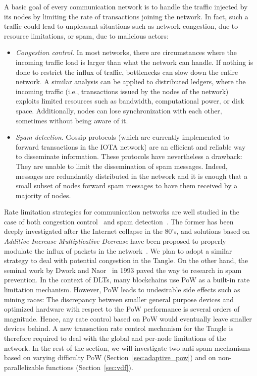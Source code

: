 \documentclass[../main.tex]{subfiles}
\begin{document}
A basic goal of every communication network is to handle the traffic injected by its nodes by limiting the rate of transactions joining the network. In fact, such a traffic could lead to unpleasant situations such as network congestion, due to resource limitations, or spam, due to malicious actors:

\begin{itemize}
    \item \textit{Congestion control.} In most networks, there are circumstances where the incoming traffic load is larger than what the network can handle. If nothing is done to restrict the influx of traffic, bottlenecks can slow down the entire network. A similar analysis can be applied to distributed ledgers, where the incoming traffic (i.e., transactions issued by the nodes of the network) exploits limited resources such as bandwidth, computational power, or disk space. Additionally, nodes can lose synchronization with each other, sometimes without being aware of it.
    \item \textit{Spam detection.} Gossip protocols (which are currently implemented to forward transactions in the IOTA network) are an efficient and reliable way to disseminate information. These protocols have nevertheless a drawback: They are unable to limit the dissemination of spam messages. Indeed, messages are redundantly distributed in the network and it is enough that a small subset of nodes forward spam messages to have them received by a majority of nodes.
\end{itemize}

Rate limitation strategies for communication networks are well studied in the case of both congestion control~\cite{kelly1998} and spam detection~\cite{dwork1993}. The former has been deeply investigated after the Internet collapse in the 80's, and solutions based on \textit{Additive Increase Multiplicative Decrease} have been proposed to properly modulate the influx of packets in the network~\cite{corless2016aimd, chiu1989, jacobson1988}. We plan to adopt a similar strategy to deal with potential congestion in the Tangle. On the other hand, the seminal work by Dwork and Naor~\cite{dwork1993} in 1993 paved the way to research in spam prevention. In the context of DLTs, many blockchains use PoW as a built-in rate limitation mechanism. However, PoW leads to undesirable side effects such as mining races: The discrepancy between smaller general purpose devices and optimized hardware with respect to the PoW performance is several orders of magnitude. Hence, any rate control based on PoW would eventually leave smaller devices behind. A new transaction rate control mechanism for the Tangle is therefore required to deal with the global and per-node limitations of the network. In the rest of the section, we will investigate two anti spam mechanisms based on varying difficulty PoW (Section~\ref{sec:adaptive_pow}) and on non-parallelizable functions (Section~\ref{sec:vdf}).
\end{document}
